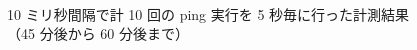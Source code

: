 \documentclass[a4j]{jarticle}
\begin{document}
\begin{description}
\begin{figure}[tb]
\begin{center}
~
~
\caption{10 ミリ秒間隔で計 10 回の ping 実行を 5 秒毎に行った計測結果（45 分後から 60 分後まで）}
\label{data1-2}
\end{center}
\end{figure}


\end{description}
\end{document}
